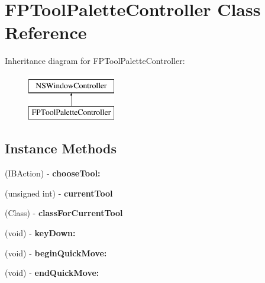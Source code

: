 \hypertarget{interface_f_p_tool_palette_controller}{}\section{F\+P\+Tool\+Palette\+Controller Class Reference}
\label{interface_f_p_tool_palette_controller}
Inheritance diagram for F\+P\+Tool\+Palette\+Controller\+:\begin{figure}[H]
\begin{center}
\leavevmode
\includegraphics[height=2.000000cm]{interface_f_p_tool_palette_controller}
\end{center}
\end{figure}
\subsection*{Instance Methods}
\begin{DoxyCompactItemize}
\item 
\mbox{\label{interface_f_p_tool_palette_controller_a42419589249530ba92f9ce6c0c8daa9c}} 
(I\+B\+Action) -\/ {\bfseries choose\+Tool\+:}
\item 
\mbox{\label{interface_f_p_tool_palette_controller_a1e18b281d48d8c59b1786fca82ac4668}} 
(unsigned int) -\/ {\bfseries current\+Tool}
\item 
\mbox{\label{interface_f_p_tool_palette_controller_a0ac4477baf915c1126e239f09a2cef26}} 
(Class) -\/ {\bfseries class\+For\+Current\+Tool}
\item 
\mbox{\label{interface_f_p_tool_palette_controller_a687b94604cb6f85485f5d5c86e1e933f}} 
(void) -\/ {\bfseries key\+Down\+:}
\item 
\mbox{\label{interface_f_p_tool_palette_controller_ae7aca9e34ba56ffd2fde4f1af97c7b9c}} 
(void) -\/ {\bfseries begin\+Quick\+Move\+:}
\item 
\mbox{\label{interface_f_p_tool_palette_controller_a366daf43c5169895bcd8d0bff5d13a56}} 
(void) -\/ {\bfseries end\+Quick\+Move\+:}
\end{DoxyCompactItemize}
